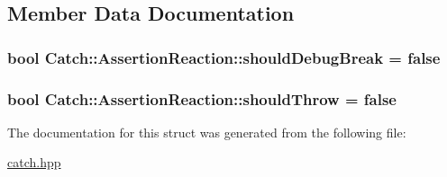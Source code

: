 \subsection{Member Data Documentation}
\hypertarget{struct_catch_1_1_assertion_reaction_adcf30fb90ff20d9789df78d424652497}{
\subsubsection[{should\-Debug\-Break}]{\setlength{\rightskip}{0pt plus 5cm}bool Catch\-::\-Assertion\-Reaction\-::should\-Debug\-Break = false}}\label{struct_catch_1_1_assertion_reaction_adcf30fb90ff20d9789df78d424652497}
\hypertarget{struct_catch_1_1_assertion_reaction_a82c8d95a2c1b6a331bde66982a8e090f}{
\subsubsection[{should\-Throw}]{\setlength{\rightskip}{0pt plus 5cm}bool Catch\-::\-Assertion\-Reaction\-::should\-Throw = false}}\label{struct_catch_1_1_assertion_reaction_a82c8d95a2c1b6a331bde66982a8e090f}


The documentation for this struct was generated from the following file\-:\begin{DoxyCompactItemize}
\item 
\hyperlink{catch_8hpp}{catch.\-hpp}\end{DoxyCompactItemize}
